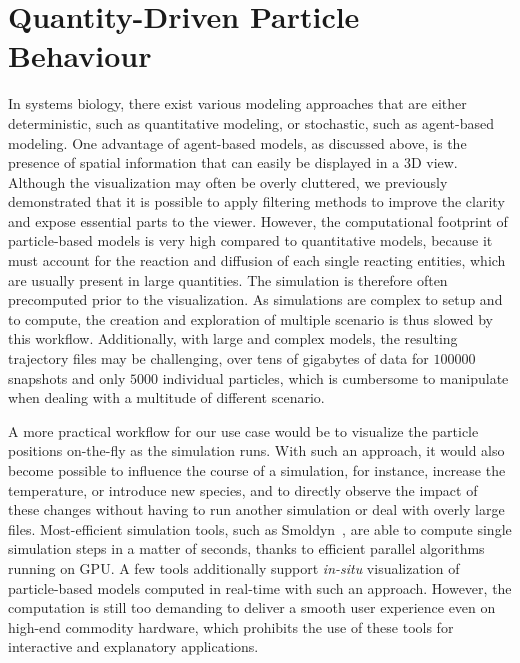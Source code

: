 \section{Quantity-Driven Particle Behaviour}

In systems biology, there exist various modeling approaches that are either deterministic, such as quantitative modeling, or stochastic, such as agent-based modeling.
One advantage of agent-based models, as discussed above, is the presence of spatial information that can easily be displayed in a 3D view.
Although the visualization may often be overly cluttered, we previously demonstrated that it is possible to apply filtering methods to improve the clarity and expose essential parts to the viewer.
However, the computational footprint of particle-based models is very high compared to quantitative models, because it must account for the reaction and diffusion of each single reacting entities, which are usually present in large quantities.
The simulation is therefore often precomputed prior to the visualization.
As simulations are complex to setup and to compute, the creation and exploration of multiple scenario is thus slowed by this workflow.
Additionally, with large and complex models, the resulting trajectory files may be challenging, over tens of gigabytes of data for $100000$ snapshots and only $5000$ individual particles, which is cumbersome to manipulate when dealing with a multitude of different scenario.

A more practical workflow for our use case would be to visualize the particle positions on-the-fly as the simulation runs.
With such an approach, it would also become possible to influence the course of a simulation, for instance, increase the temperature, or introduce new species, and to directly observe the impact of these changes without having to run another simulation or deal with overly large files.
Most-efficient simulation tools, such as Smoldyn~\cite{andrews2010detailed}, are able to compute single simulation steps in a matter of seconds, thanks to efficient parallel algorithms running on GPU.
A few tools additionally support \textit{in-situ} visualization of particle-based models computed in real-time with such an approach.
However, the computation is still too demanding to deliver a smooth user experience even on high-end commodity hardware, which prohibits the use of these tools for interactive and explanatory applications.


